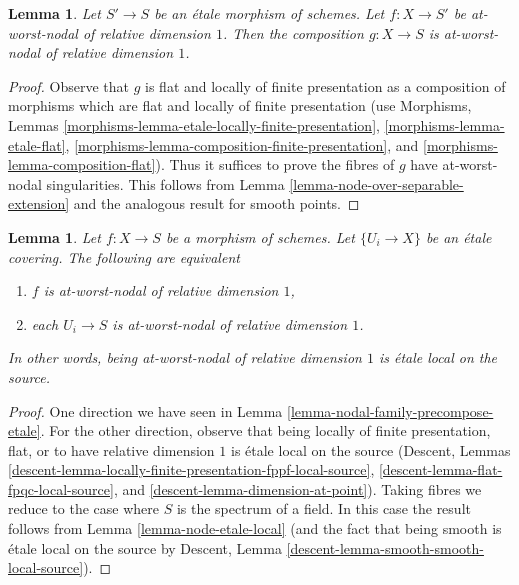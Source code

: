 \documentclass{stacks-project}
\theoremstyle{plain}
\newtheorem{lemma}[subsection]{Lemma}
\theoremstyle{definition}
\theoremstyle{remark}
\numberwithin{equation}{subsection}
\begin{document}
\begin{lemma}
\label{lemma-nodal-family-postcompose-etale}
Let $S' \to S$ be an \'etale morphism of schemes.
Let $f : X \to S'$ be at-worst-nodal of relative dimension $1$.
Then the composition $g : X \to S$
is at-worst-nodal of relative dimension $1$.
\end{lemma}

\begin{proof}
Observe that $g$ is flat and locally of finite presentation as
a composition of morphisms which are flat and locally of finite
presentation (use
Morphisms, Lemmas \ref{morphisms-lemma-etale-locally-finite-presentation},
\ref{morphisms-lemma-etale-flat},
\ref{morphisms-lemma-composition-finite-presentation}, and
\ref{morphisms-lemma-composition-flat}).
Thus it suffices to prove the fibres of $g$
have at-worst-nodal singularities.
This follows from Lemma \ref{lemma-node-over-separable-extension}
and the analogous result for smooth points.
\end{proof}

\begin{lemma}
\label{lemma-nodal-family-etale-local-source}
Let $f : X \to S$ be a morphism of schemes. Let $\{U_i \to X\}$
be an \'etale covering. The following are equivalent
\begin{enumerate}
\item $f$ is at-worst-nodal of relative dimension $1$,
\item each $U_i \to S$ is at-worst-nodal of relative dimension $1$.
\end{enumerate}
In other words, being at-worst-nodal of relative dimension $1$
is \'etale local on the source.
\end{lemma}

\begin{proof}
One direction we have seen in Lemma \ref{lemma-nodal-family-precompose-etale}.
For the other direction, observe that being locally of finite
presentation, flat, or to have relative dimension $1$
is \'etale local on the source
(Descent, Lemmas
\ref{descent-lemma-locally-finite-presentation-fppf-local-source},
\ref{descent-lemma-flat-fpqc-local-source}, and
\ref{descent-lemma-dimension-at-point}). Taking fibres we reduce
to the case where $S$ is the spectrum of a field. In this case the
result follows from Lemma \ref{lemma-node-etale-local}
(and the fact that being smooth is \'etale local on the source by
Descent, Lemma \ref{descent-lemma-smooth-smooth-local-source}).
\end{proof}
\end{document}
